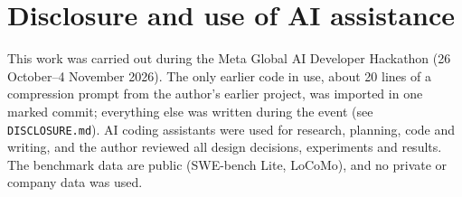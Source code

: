 \documentclass[10pt,twocolumn]{article}
\begin{document}
\section*{Disclosure and use of AI assistance}
This work was carried out during the Meta Global AI Developer Hackathon (26 October--4 November 2026). The only earlier code in use, about 20 lines of a compression prompt from the author's earlier project, was imported in one marked commit; everything else was written during the event (see \texttt{DISCLOSURE.md}). AI coding assistants were used for research, planning, code and writing, and the author reviewed all design decisions, experiments and results. The benchmark data are public (SWE-bench Lite, LoCoMo), and no private or company data was used.



\end{document}
